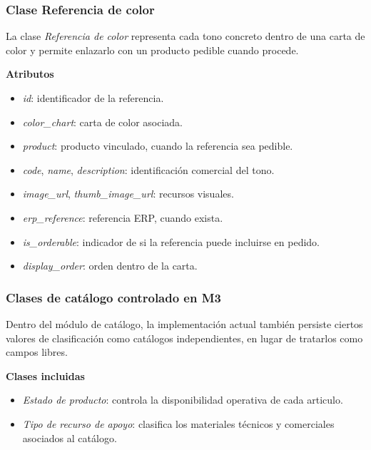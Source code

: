\subsubsection{Clase Referencia de color}

La clase \textit{Referencia de color} representa cada tono concreto dentro de una carta de color y permite enlazarlo con un producto pedible cuando procede.

\textbf{Atributos}

\begin{itemize}
      \item \textit{id}: identificador de la referencia.
      \item \textit{color\_chart}: carta de color asociada.
      \item \textit{product}: producto vinculado, cuando la referencia sea pedible.
      \item \textit{code}, \textit{name}, \textit{description}: identificación comercial del tono.
      \item \textit{image\_url}, \textit{thumb\_image\_url}: recursos visuales.
      \item \textit{erp\_reference}: referencia ERP, cuando exista.
      \item \textit{is\_orderable}: indicador de si la referencia puede incluirse en pedido.
      \item \textit{display\_order}: orden dentro de la carta.
\end{itemize}

\subsubsection{Clases de catálogo controlado en M3}

Dentro del módulo de catálogo, la implementación actual también persiste ciertos valores de clasificación como catálogos independientes, en lugar de tratarlos como campos libres.

\textbf{Clases incluidas}

\begin{itemize}
      \item \textit{Estado de producto}: controla la disponibilidad operativa de cada articulo.
      \item \textit{Tipo de recurso de apoyo}: clasifica los materiales técnicos y comerciales asociados al catálogo.
\end{itemize}

